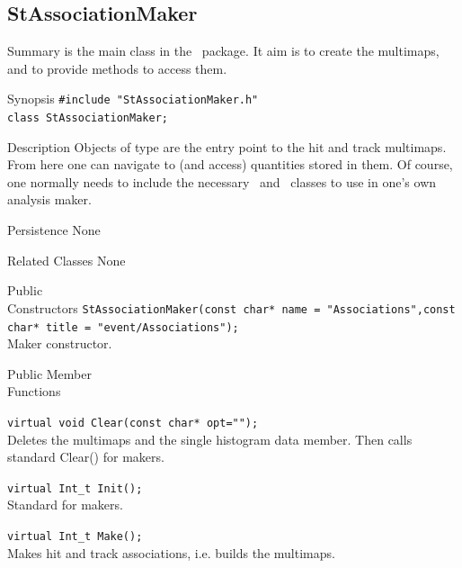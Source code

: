 \subsection{StAssociationMaker}
\label{sec:StAssociationMaker}
\begin{Entry}
\item[Summary]
     is the main class in the \StAssociationMaker\ package.
    It aim is to create the multimaps, and to provide methods to access them. 

\item[Synopsis]
    \verb+#include "StAssociationMaker.h"+\\
    \verb+class StAssociationMaker;+\\

\item[Description]
    Objects of type  are the entry point to the hit
    and track multimaps.
    From here one can navigate to (and access) quantities stored
    in them.  Of course, one normally needs to include the necessary
    \StEvent\ and \StMcEvent\ classes to use in one's own analysis maker.

\item[Persistence]
    None

\item[Related Classes]
    None

\item[Public\\ Constructors]
    \verb+StAssociationMaker(const char* name = "Associations",const char* title = "event/Associations");+\\
		       
    Maker constructor.

\item[Public Member\\ Functions]
    

    \verb+virtual void Clear(const char* opt="");+\\
    Deletes the multimaps and the single histogram data member.  Then calls standard Clear() for makers. 

    \verb+virtual Int_t Init();+\\
    Standard for makers. 

    \verb+virtual Int_t Make();+\\
    Makes hit and track associations, i.e. builds the multimaps.


\end{Entry}
